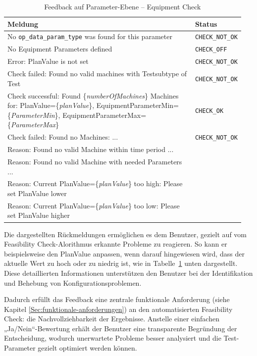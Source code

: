 \begin{table}[!htb]
    \centering
    \caption{Feedback auf Parameter-Ebene -- Equipment Check}
    \footnotesize
    \renewcommand{\arraystretch}{1.1}
    \begin{tabular}{p{0.8\linewidth} p{0.15\linewidth}}
        \textbf{Meldung} & \textbf{Status} \\
        \midrule
        No \texttt{op\_data\_param\_type} was found for this parameter & \texttt{CHECK\_NOT\_OK} \\
        \midrule
        No Equipment Parameters defined & \texttt{CHECK\_OFF} \\
        \midrule
        Error: PlanValue is not set & \texttt{CHECK\_NOT\_OK} \\
        \midrule
        Check failed: Found no valid machines with Testsubtype of Test & \texttt{CHECK\_NOT\_OK} \\
        \midrule
        Check successful: Found \{\textit{numberOfMachines}\} Machines for: PlanValue=\{\textit{planValue}\}, EquipmentParameterMin=\{\textit{ParameterMin}\}, EquipmentParameterMax=\{\textit{ParameterMax}\} & \texttt{CHECK\_OK} \\
        \midrule
        Check failed: Found no Machines: ... & \texttt{CHECK\_NOT\_OK} \\
        \quad Reason: Found no valid Machine within time period ... & \\
        \quad Reason: Found no valid Machine with needed Parameters ... & \\
        \quad Reason: Current PlanValue=\{\textit{planValue}\} too high: Please set PlanValue lower & \\
        \quad Reason: Current PlanValue=\{\textit{planValue}\} too low: Please set PlanValue higher & \\
        \bottomrule
    \end{tabular}
    \label{tab:feedback-equipment}
\end{table}



Die dargestellten Rückmeldungen ermöglichen es dem Benutzer, gezielt auf vom Feasibility Check-Alorithmus erkannte Probleme zu reagieren. So kann er beispielsweise den PlanValue anpassen, wenn darauf hingewiesen wird, dass der aktuelle Wert zu hoch oder zu niedrig ist, wie in Tabelle~\ref{tab:feedback-equipment} unten dargestellt. Diese detaillierten Informationen unterstützen den Benutzer bei der Identifikation und Behebung von Konfigurationsproblemen. 

Dadurch erfüllt das Feedback eine zentrale funktionale Anforderung (siehe Kapitel \ref{Sec:funktionale-anforderungen}) an den automatisierten Feasibility Check: die Nachvollziehbarkeit der Ergebnisse. Anstelle einer einfachen „Ja/Nein“-Bewertung erhält der Benutzer eine transparente Begründung der Entscheidung, wodurch unerwartete Probleme besser analysiert und die Test-Parameter gezielt optimiert werden können.